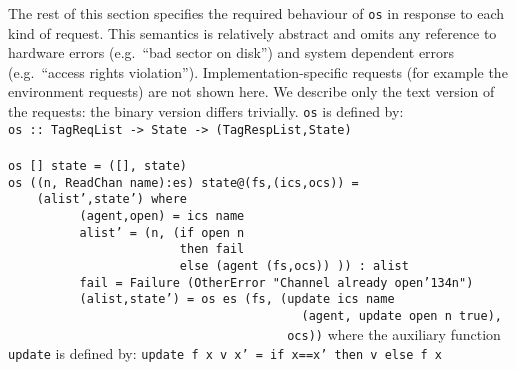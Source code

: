 The rest of this section specifies the required behaviour of \mbox{\tt os} in
response to each kind of request.  This semantics is relatively
abstract and omits any reference to hardware errors (e.g.~``bad
sector on disk'') and system dependent errors (e.g.~``access rights
violation'').  Implementation-specific requests (for example the
environment requests) are not shown here.  We describe only
the text version of the requests: the binary version differs
trivially. \mbox{\tt os} is defined by:
\bprog
\mbox{\tt os\ ::\ TagReqList\ ->\ State\ ->\ (TagRespList,State)}\\
\mbox{\tt }\\[-8pt]
\mbox{\tt os\ []\ state\ =\ ([],\ state)}\\
\mbox{\tt os\ ((n,\ ReadChan\ name):es)\ state@(fs,(ics,ocs))\ =}\\
\mbox{\tt \ \ \ \ (alist',state')\ where}\\
\mbox{\tt \ \ \ \ \ \ \ \ \ \ (agent,open)\ =\ ics\ name}\\
\mbox{\tt \ \ \ \ \ \ \ \ \ \ alist'\ =\ (n,\ (if\ open\ n}\\
\mbox{\tt \ \ \ \ \ \ \ \ \ \ \ \ \ \ \ \ \ \ \ \ \ \ \ \ then\ fail}\\
\mbox{\tt \ \ \ \ \ \ \ \ \ \ \ \ \ \ \ \ \ \ \ \ \ \ \ \ else\ (agent\ (fs,ocs))\ ))\ :\ alist}\\
\mbox{\tt \ \ \ \ \ \ \ \ \ \ fail\ =\ Failure\ (OtherError\ "Channel\ already\ open{\char'134}n")}\\
\mbox{\tt \ \ \ \ \ \ \ \ \ \ (alist,state')\ =\ os\ es\ (fs,\ (update\ ics\ name}\\
\mbox{\tt \ \ \ \ \ \ \ \ \ \ \ \ \ \ \ \ \ \ \ \ \ \ \ \ \ \ \ \ \ \ \ \ \ \ \ \ \ \ \ \ \ (agent,\ update\ open\ n\ true),}\\
\mbox{\tt \ \ \ \ \ \ \ \ \ \ \ \ \ \ \ \ \ \ \ \ \ \ \ \ \ \ \ \ \ \ \ \ \ \ \ \ \ \ \ ocs))}
\eprog
where the auxiliary function \mbox{\tt update} is defined by:
\bprog
\mbox{\tt update\ f\ x\ v\ x'\ =\ if\ x==x'\ then\ v\ else\ f\ x}
\eprogNoSkip

